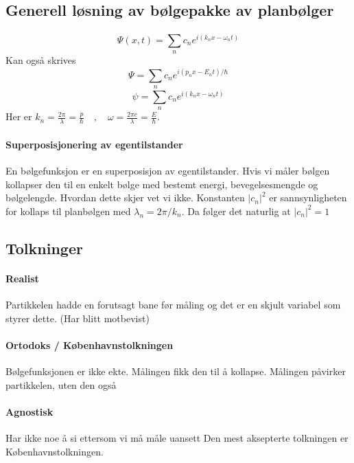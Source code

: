 \subsection{Generell løsning av bølgepakke av planbølger}
\[
Ψ(x,t) = \sum_{n}^{} c_n e^{i \left( k_n x - ω_n t  \right) }
\]
Kan også skrives 
\[
Ψ = \sum_{n}^{} c_n e^{i \left( p_n x - E_n t \right)/ℏ}
\]
\[
ψ = \sum_{n}^{} c_n e^{i \left( k_n x - ω_n t \right)}
\]
Her er $\displaystyle k_n = \frac{2π}{λ} = \frac{p}{ℏ}\quad , \quad ω = \frac{2πc}{λ} = \frac{E}{ℏ}$. 
\paragraph{Superposisjonering av egentilstander}
En bølgefunksjon er en superposisjon av egentilstander. Hvis vi måler bølgen kollapser den til en enkelt bølge med bestemt energi, bevegelsesmengde og bølgelengde. Hvordan dette skjer vet vi ikke. Konstanten $\left|c_n\right|^2 $ er sannsynligheten for kollaps til planbølgen med $λ_n = 2π / k_n$. Da følger det naturlig at $\left|c_n\right|^2 = 1$

\subsection{Tolkninger}
\paragraph{Realist}
Partikkelen hadde en forutsagt bane før måling og det er en skjult variabel som styrer dette. (Har blitt motbevist)
\paragraph{Ortodoks / Københavnstolkningen}
Bølgefunksjonen er ikke ekte. Målingen fikk den til  å kollapse. Målingen påvirker partikkelen, uten den også 
\paragraph{Agnostisk}
Har ikke noe å si ettersom vi må måle uansett
\newline \newline
Den mest aksepterte tolkningen er Københavnstolkningen. 
